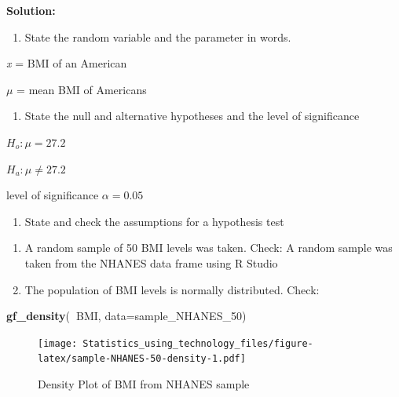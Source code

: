 \documentclass[]{book}
\newenvironment{Shaded}{\begin{snugshade}}{\end{snugshade}}
\newcommand{\DataTypeTok}[1]{\textcolor[rgb]{0.13,0.29,0.53}{#1}}
\newcommand{\DecValTok}[1]{\textcolor[rgb]{0.00,0.00,0.81}{#1}}
\newcommand{\KeywordTok}[1]{\textcolor[rgb]{0.13,0.29,0.53}{\textbf{#1}}}
\newcommand{\NormalTok}[1]{#1}
\newcommand{\OperatorTok}[1]{\textcolor[rgb]{0.81,0.36,0.00}{\textbf{#1}}}
\providecommand{\tightlist}{%
  \setlength{\itemsep}{0pt}\setlength{\parskip}{0pt}}
\begin{document}
\textbf{Solution:}

\begin{enumerate}
\def\labelenumi{\arabic{enumi}.}
\tightlist
\item
  State the random variable and the parameter in words.
\end{enumerate}

\emph{x} = BMI of an American

\(\mu\) = mean BMI of Americans

\begin{enumerate}
\def\labelenumi{\arabic{enumi}.}
\setcounter{enumi}{1}
\tightlist
\item
  State the null and alternative hypotheses and the level of significance
\end{enumerate}

\(H_o:\mu=27.2\)

\(H_a:\mu\ne 27.2\)

level of significance \(\alpha=0.05\)

\begin{enumerate}
\def\labelenumi{\arabic{enumi}.}
\setcounter{enumi}{2}
\tightlist
\item
  State and check the assumptions for a hypothesis test
\end{enumerate}

\begin{enumerate}
\def\labelenumi{\alph{enumi}.}
\item
  A random sample of 50 BMI levels was taken. Check: A random sample was taken from the NHANES data frame using R Studio
\item
  The population of BMI levels is normally distributed. Check:
\end{enumerate}



\begin{Shaded}
\begin{Highlighting}[]
\KeywordTok{gf_density}\NormalTok{(}\OperatorTok{~}\NormalTok{BMI, }\DataTypeTok{data=}\NormalTok{sample_NHANES_}\DecValTok{50}\NormalTok{)}
\end{Highlighting}
\end{Shaded}

\begin{figure}
\centering
\texttt{[image: Statistics\_using\_technology\_files/figure-latex/sample-NHANES-50-density-1.pdf]}
\caption{\label{fig:sample-NHANES-50-density}Density Plot of BMI from NHANES sample}
\end{figure}
\end{document}
